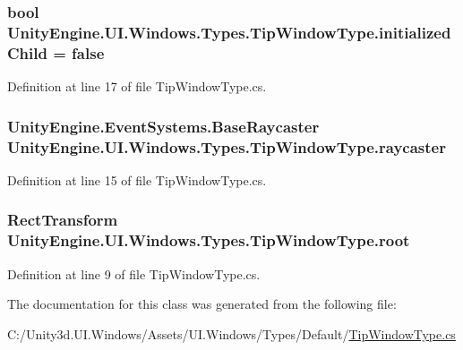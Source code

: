 \subsubsection[{initialized\+Child}]{\setlength{\rightskip}{0pt plus 5cm}bool Unity\+Engine.\+U\+I.\+Windows.\+Types.\+Tip\+Window\+Type.\+initialized\+Child = false}\label{class_unity_engine_1_1_u_i_1_1_windows_1_1_types_1_1_tip_window_type_aeeb9086268e6713d12b32c4a30e8d72c}


Definition at line 17 of file Tip\+Window\+Type.\+cs.

\hypertarget{class_unity_engine_1_1_u_i_1_1_windows_1_1_types_1_1_tip_window_type_a67720f96a24ec43b3e278d74fe8500a2}{}
\subsubsection[{raycaster}]{\setlength{\rightskip}{0pt plus 5cm}Unity\+Engine.\+Event\+Systems.\+Base\+Raycaster Unity\+Engine.\+U\+I.\+Windows.\+Types.\+Tip\+Window\+Type.\+raycaster}\label{class_unity_engine_1_1_u_i_1_1_windows_1_1_types_1_1_tip_window_type_a67720f96a24ec43b3e278d74fe8500a2}


Definition at line 15 of file Tip\+Window\+Type.\+cs.

\hypertarget{class_unity_engine_1_1_u_i_1_1_windows_1_1_types_1_1_tip_window_type_a106008af107c25202fa70c10c6c00ec3}{}
\subsubsection[{root}]{\setlength{\rightskip}{0pt plus 5cm}Rect\+Transform Unity\+Engine.\+U\+I.\+Windows.\+Types.\+Tip\+Window\+Type.\+root}\label{class_unity_engine_1_1_u_i_1_1_windows_1_1_types_1_1_tip_window_type_a106008af107c25202fa70c10c6c00ec3}


Definition at line 9 of file Tip\+Window\+Type.\+cs.



The documentation for this class was generated from the following file\+:\begin{DoxyCompactItemize}
\item 
C\+:/\+Unity3d.\+U\+I.\+Windows/\+Assets/\+U\+I.\+Windows/\+Types/\+Default/\hyperlink{_tip_window_type_8cs}{Tip\+Window\+Type.\+cs}\end{DoxyCompactItemize}
